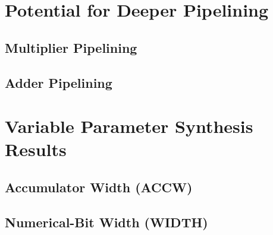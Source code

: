 \documentclass[a4paper,11pt]{article}
\begin{document}

\section{Potential for Deeper Pipelining}

\subsection{Multiplier Pipelining}



\subsection{Adder Pipelining}


\section{Variable Parameter Synthesis Results}


\subsection{Accumulator Width (ACCW)}

\subsection{Numerical-Bit Width (WIDTH)}
\end{document}
